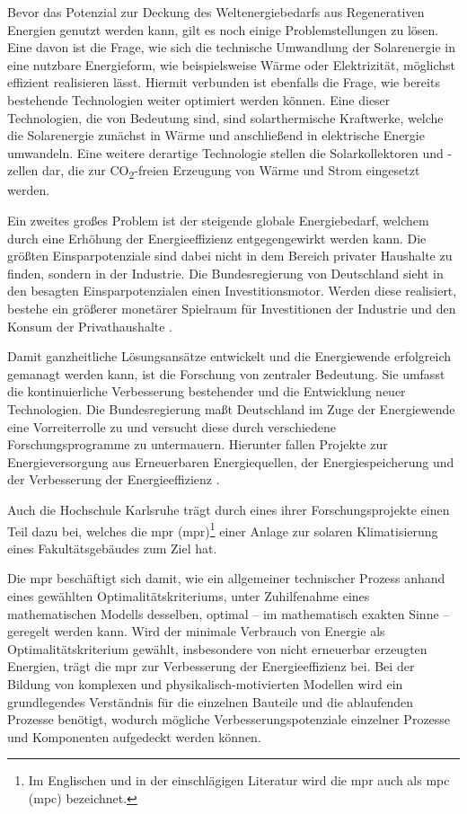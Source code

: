 Bevor das Potenzial zur Deckung des Weltenergiebedarfs aus Regenerativen Energien genutzt werden kann, gilt es noch einige Problemstellungen zu lösen.
Eine davon ist die Frage, wie sich die technische Umwandlung der Solarenergie in eine nutzbare Energieform, wie beispielsweise Wärme oder Elektrizität, möglichst effizient realisieren lässt. Hiermit verbunden ist ebenfalls die Frage, wie bereits bestehende Technologien weiter optimiert werden können. Eine dieser Technologien, die von Bedeutung sind, sind solarthermische Kraftwerke, welche die Solarenergie zunächst in Wärme und anschließend in elektrische Energie umwandeln. Eine weitere derartige Technologie stellen die Solarkollektoren und -zellen dar, die zur CO\textsubscript{2}-freien Erzeugung von Wärme und Strom eingesetzt werden\cite[S.~36f.]{qu11}.

Ein zweites großes Problem ist der steigende globale Energiebedarf, welchem durch eine Erhöhung der Energieeffizienz entgegengewirkt werden kann. Die größten Einsparpotenziale sind dabei nicht in dem Bereich privater Haushalte zu finden, sondern in der Industrie. Die Bundesregierung von Deutschland sieht in den besagten Einsparpotenzialen einen Investitionsmotor. Werden diese realisiert, bestehe ein größerer monetärer Spielraum für Investitionen der Industrie und den Konsum der Privathaushalte \cite[S.~2]{bi15}.

Damit ganzheitliche Lösungsansätze entwickelt und die Energiewende erfolgreich gemanagt werden kann, ist die Forschung von zentraler Bedeutung. Sie umfasst die kontinuierliche Verbesserung bestehender und die Entwicklung neuer Technologien. Die Bundesregierung maßt Deutschland im Zuge der Energiewende eine Vorreiterrolle zu und versucht diese durch verschiedene Forschungsprogramme zu untermauern. Hierunter fallen Projekte zur Energieversorgung aus Erneuerbaren Energiequellen, der Energiespeicherung und der Verbesserung der Energieeffizienz \cite[S.~11]{bi15}.
 
Auch die Hochschule Karlsruhe trägt durch eines ihrer Forschungsprojekte einen Teil dazu bei, welches die \acrlong{mpr} (\acrshort{mpr})\footnote{Im Englischen und in der einschlägigen Literatur wird die \acrlong{mpr} auch als \acrlong{mpc} (\acrshort{mpc}) bezeichnet.} einer Anlage zur solaren Klimatisierung eines Fakultätsgebäudes zum Ziel hat.

Die \acrlong{mpr} beschäftigt sich damit, wie ein allgemeiner technischer Prozess anhand eines gewählten Optimalitätskriteriums, unter Zuhilfenahme eines mathematischen Modells desselben, optimal -- im mathematisch exakten Sinne -- geregelt werden kann. Wird der minimale Verbrauch von Energie als Optimalitätskriterium gewählt, insbesondere von nicht erneuerbar erzeugten Energien, trägt die \acrshort{mpr} zur Verbesserung der Energieeffizienz bei.
Bei der Bildung von komplexen und physikalisch-motivierten Modellen wird ein grundlegendes Verständnis für die einzelnen Bauteile und die ablaufenden Prozesse benötigt, wodurch mögliche Verbesserungspotenziale einzelner Prozesse und Komponenten aufgedeckt werden können.

